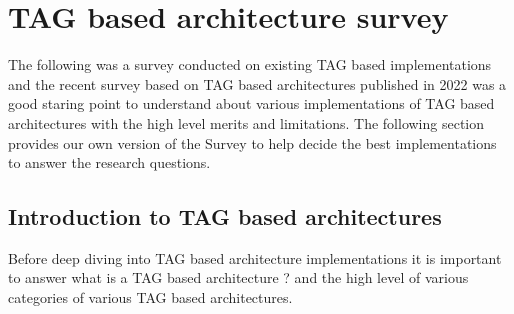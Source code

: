 














\section[TAG based architecture survey]{TAG based architecture survey}   
The following was a survey conducted on existing TAG based implementations and the 
recent survey based on TAG based architectures \cite{acmTAGSurvey} published
in 2022 was a good staring point to understand about various implementations of TAG
based architectures with the high level merits and limitations. The following section 
provides our own version of the Survey to help decide the best implementations 
to answer the research questions.

\subsection{Introduction to TAG based architectures}

Before deep diving into TAG based architecture implementations it is important to 
answer what is a TAG based architecture ? and the high level of various 
categories of various TAG based architectures.

